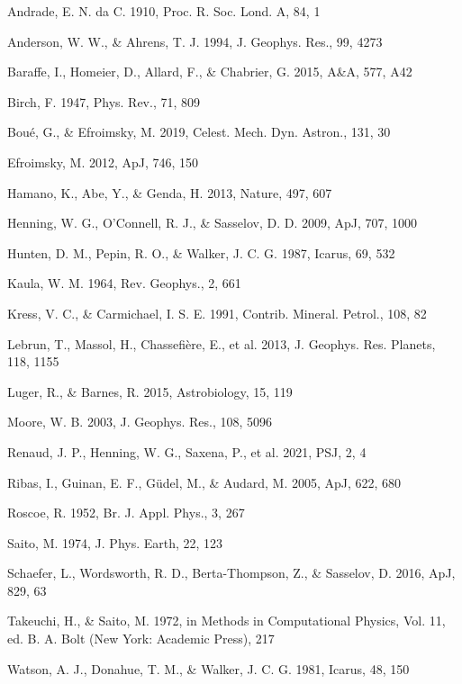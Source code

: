 \documentclass[11pt]{article}
\begin{document}
\begin{thebibliography}{}

 Andrade, E. N. da C. 1910, Proc. R. Soc. Lond. A, 84, 1

 Anderson, W. W., \& Ahrens, T. J. 1994, J. Geophys. Res., 99, 4273

 Baraffe, I., Homeier, D., Allard, F., \& Chabrier, G. 2015, A\&A, 577, A42

 Birch, F. 1947, Phys. Rev., 71, 809

 Bou\'e, G., \& Efroimsky, M. 2019, Celest. Mech. Dyn. Astron., 131, 30

 Efroimsky, M. 2012, ApJ, 746, 150

 Hamano, K., Abe, Y., \& Genda, H. 2013, Nature, 497, 607

 Henning, W. G., O'Connell, R. J., \& Sasselov, D. D. 2009, ApJ, 707, 1000

 Hunten, D. M., Pepin, R. O., \& Walker, J. C. G. 1987, Icarus, 69, 532

 Kaula, W. M. 1964, Rev. Geophys., 2, 661

 Kress, V. C., \& Carmichael, I. S. E. 1991, Contrib. Mineral. Petrol., 108, 82

 Lebrun, T., Massol, H., Chassefi\`ere, E., et al. 2013, J. Geophys. Res. Planets, 118, 1155

 Luger, R., \& Barnes, R. 2015, Astrobiology, 15, 119

 Moore, W. B. 2003, J. Geophys. Res., 108, 5096

 Renaud, J. P., Henning, W. G., Saxena, P., et al. 2021, PSJ, 2, 4

 Ribas, I., Guinan, E. F., G\"udel, M., \& Audard, M. 2005, ApJ, 622, 680

 Roscoe, R. 1952, Br. J. Appl. Phys., 3, 267

 Saito, M. 1974, J. Phys. Earth, 22, 123

 Schaefer, L., Wordsworth, R. D., Berta-Thompson, Z., \& Sasselov, D. 2016, ApJ, 829, 63

 Takeuchi, H., \& Saito, M. 1972, in Methods in Computational Physics, Vol. 11, ed. B. A. Bolt (New York: Academic Press), 217

 Watson, A. J., Donahue, T. M., \& Walker, J. C. G. 1981, Icarus, 48, 150

\end{thebibliography}
\end{document}
